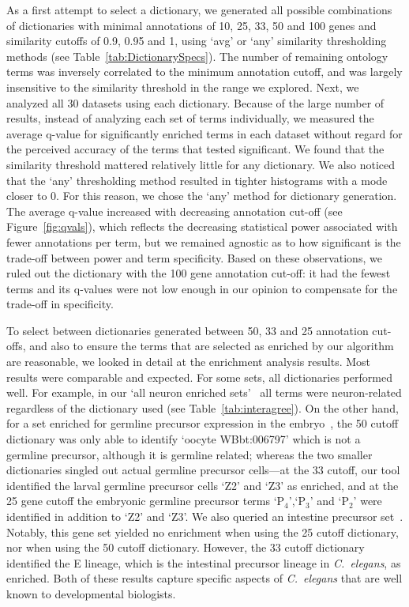 \documentclass{bmcart}
\begin{document}
As a first attempt to select a dictionary, we generated all possible combinations of dictionaries with minimal annotations of 10, 25, 33, 50 and 100 genes and similarity cutoffs of 0.9, 0.95 and 1, using `avg' or `any' similarity thresholding methods (see Table~\ref{tab:DictionarySpecs}). The number of remaining ontology terms was inversely correlated to the minimum annotation cutoff, and was largely insensitive to the similarity threshold in the range we explored. Next, we analyzed all 30 datasets using each dictionary. Because of the large number of results, instead of analyzing each set of terms individually, we measured the average q-value for significantly enriched terms in each dataset without regard for the perceived accuracy of the terms that tested significant. We found that the similarity threshold mattered relatively little for any dictionary. We also noticed that the `any' thresholding method resulted in tighter histograms with a mode closer to 0. For this reason, we chose the `any' method for dictionary generation. The average q-value increased with decreasing annotation cut-off (see Figure~\ref{fig:qvals}), which reflects the decreasing statistical power associated with fewer annotations per term, but we remained agnostic as to how significant is the trade-off between power and term specificity. Based on these observations, we ruled out the dictionary with the 100 gene annotation cut-off: it had the fewest terms and its q-values were not low enough in our opinion to compensate for the trade-off in specificity. 

To select between dictionaries generated between 50, 33 and 25 annotation cut-offs, and also to ensure the terms that are selected as enriched by our algorithm are reasonable, we looked in detail at the enrichment analysis results. Most results were comparable and expected. For some sets, all dictionaries performed well. For example, in our `all neuron enriched sets'~\cite{Spencer2011, Watson2008a} all terms were neuron-related regardless of the dictionary used (see Table~\ref{tab:interagree}). On the other hand, for a set enriched for germline precursor expression in the embryo~\cite{Spencer2011}, the 50 cutoff dictionary was only able to identify `oocyte WBbt:006797' which is not a germline precursor, although it is germline related; whereas the two smaller dictionaries singled out actual germline precursor cells---at the 33 cutoff, our tool identified the larval germline precursor cells `Z2' and `Z3' as enriched, and at the 25 gene cutoff the embryonic germline precursor terms `P$_4$',`P$_3$' and `P$_2$' were identified in addition to `Z2' and `Z3'. 
We also queried an intestine precursor set~\cite{Spencer2011}. Notably, this gene set yielded no enrichment when using the 25 cutoff dictionary, nor when using the 50 cutoff dictionary. However, the 33 cutoff dictionary identified the E lineage, which is the intestinal precursor lineage in \emph{C.~elegans}, as enriched. Both of these results capture specific aspects of \emph{C.~elegans} that are well known to developmental biologists. 
\end{document}
